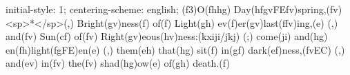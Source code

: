 initial-style: 1;
centering-scheme: english;
(f3)O(fhhg) Day(hfgvFEfv)spring,(fv) <sp>*</sp>(,) Bright(gv)ness(f) of(f) Light(gh) ev(f)er(gv)last(ffv)ing,(e) (,) and(fv) Sun(cf) of(fv) Right(gv)eous(hv)ness:(kxiji/jkj) (;) come(ji) and(hg) en(fh)light(fgFE)en(e) (,) them(eh) that(hg) sit(f) in(gf) dark(ef)ness,(fvEC) (,) and(ev) in(fv) the(fv) shad(hg)ow(e) of(gh) death.(f)
